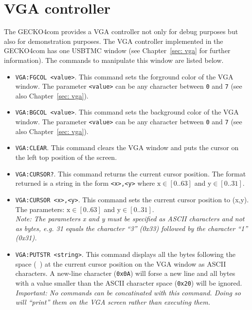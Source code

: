 \section{VGA controller}
\label{sec: vga commands}
The {\sc GECKO4com} provides a VGA controller not only for debug purposes but
also for demonstration purposes. The VGA controller implemented in the {\sc
GECKO4com} has one USBTMC window (see Chapter~\ref{sec: vga} for further
information). The commands to manipulate this window are listed below.
\begin{itemize}
\item \verb*+VGA:FGCOL <value>+. This command sets the forground color of the
VGA window. The parameter \verb+<value>+ can be any character between \verb+0+
and \verb+7+ (see also Chapter~\ref{sec: vga}).
\item \verb*+VGA:BGCOL <value>+. This command sets the background color of the
VGA window. The parameter \verb+<value>+ can be any character between \verb+0+
and \verb+7+ (see also Chapter~\ref{sec: vga}).
\item \verb+VGA:CLEAR+. This command clears the VGA window and puts the cursor
on the left top position of the screen.
\item \verb+VGA:CURSOR?+. This command returns the current cursor position. The
format returned is a string in the form \verb+<x>,<y>+ where
$\text{x}\in[0..63]$ and $\text{y}\in[0..31]$.
\item \verb*+VGA:CURSOR <x>,<y>+. This command sets the current cursor position
to (x,y). The parameters: $\text{x}\in[0..63]$ and $\text{y}\in[0..31]$.\\
\textit{Note: The parameters x and y must be specified as ASCII characters and
not as bytes, e.g. 31 equals the character ``3'' (0x33) followed by the
character ``1'' (0x31).\note}
\item \verb*+VGA:PUTSTR <string>+. This command displays all the bytes following
the space (\verb*+ +) at the current cursor position on the VGA window as ASCII
characters. A new-line character (\verb+0x0A+) will forse a new line and all
bytes with a value smaller than the ASCII character space (\verb+0x20+) will be
ignored.\\
\textit{Important: No commands can be concatinated with this command. Doing so
will ``print'' them on the VGA screen rather than executing them.\important}
\end{itemize}
